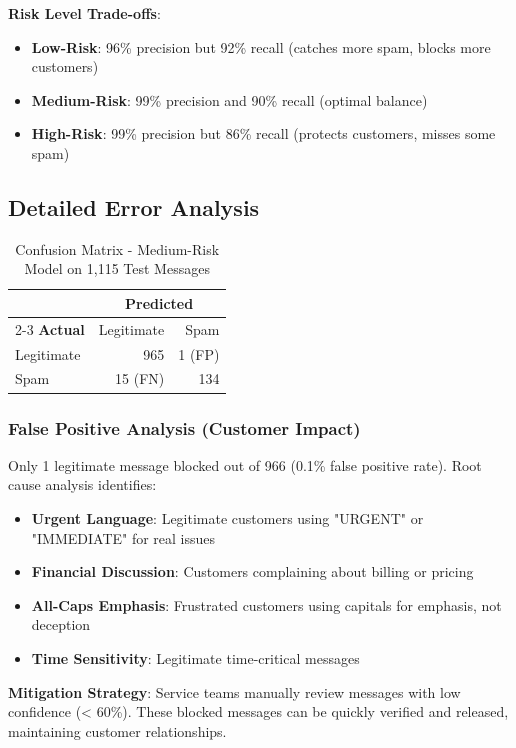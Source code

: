 \documentclass[12pt,a4paper]{article}
\begin{document}
\textbf{Risk Level Trade-offs}:
\begin{itemize}
    \item \textbf{Low-Risk}: 96\% precision but 92\% recall (catches more spam, blocks more customers)
    \item \textbf{Medium-Risk}: 99\% precision and 90\% recall (optimal balance)
    \item \textbf{High-Risk}: 99\% precision but 86\% recall (protects customers, misses some spam)
\end{itemize}

\subsection{Detailed Error Analysis}

\begin{table}[H]
\centering
\begin{tabular}{lrr}
\toprule
 & \multicolumn{2}{c}{\textbf{Predicted}} \\
\cmidrule{2-3}
\textbf{Actual} & Legitimate & Spam \\
\midrule
Legitimate & 965 & 1 (FP) \\
Spam & 15 (FN) & 134 \\
\bottomrule
\end{tabular}
\caption{Confusion Matrix - Medium-Risk Model on 1,115 Test Messages}
\end{table}

\subsubsection{False Positive Analysis (Customer Impact)}

Only 1 legitimate message blocked out of 966 (0.1\% false positive rate). Root cause analysis identifies:

\begin{itemize}
    \item \textbf{Urgent Language}: Legitimate customers using "URGENT" or "IMMEDIATE" for real issues
    \item \textbf{Financial Discussion}: Customers complaining about billing or pricing
    \item \textbf{All-Caps Emphasis}: Frustrated customers using capitals for emphasis, not deception
    \item \textbf{Time Sensitivity}: Legitimate time-critical messages
\end{itemize}

\textbf{Mitigation Strategy}: Service teams manually review messages with low confidence (< 60\%). These blocked messages can be quickly verified and released, maintaining customer relationships.
\end{document}
